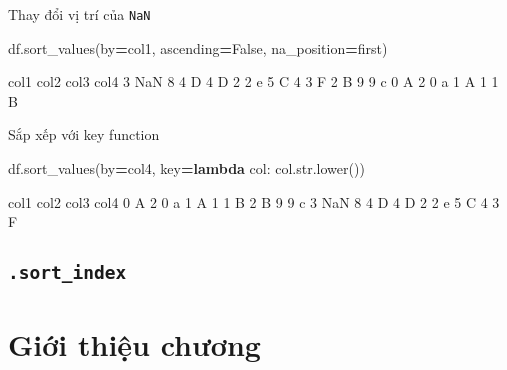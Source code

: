 \documentclass[
]{book}
\newenvironment{Shaded}{\begin{snugshade}}{\end{snugshade}}
\newcommand{\BuiltInTok}[1]{#1}
\newcommand{\KeywordTok}[1]{\textcolor[rgb]{0.13,0.29,0.53}{\textbf{#1}}}
\newcommand{\NormalTok}[1]{#1}
\newcommand{\OperatorTok}[1]{\textcolor[rgb]{0.81,0.36,0.00}{\textbf{#1}}}
\newcommand{\StringTok}[1]{\textcolor[rgb]{0.31,0.60,0.02}{#1}}
\newcommand{\VariableTok}[1]{\textcolor[rgb]{0.00,0.00,0.00}{#1}}
\begin{document}
Thay đổi vị trí của \texttt{NaN}

\begin{Shaded}
\begin{Highlighting}[]
\NormalTok{df.sort\_values(by}\OperatorTok{=}\StringTok{\textquotesingle{}col1\textquotesingle{}}\NormalTok{, ascending}\OperatorTok{=}\VariableTok{False}\NormalTok{, na\_position}\OperatorTok{=}\StringTok{\textquotesingle{}first\textquotesingle{}}\NormalTok{)}
\end{Highlighting}
\end{Shaded}

\begin{Shaded}
\begin{Highlighting}[]
\NormalTok{  col1  col2  col3 col4}
\NormalTok{3  NaN     8     4    D}
\NormalTok{4    D     2     2    e}
\NormalTok{5    C     4     3    F}
\NormalTok{2    B     9     9    c}
\NormalTok{0    A     2     0    a}
\NormalTok{1    A     1     1    B}
\end{Highlighting}
\end{Shaded}

Sắp xếp với key function

\begin{Shaded}
\begin{Highlighting}[]
\NormalTok{df.sort\_values(by}\OperatorTok{=}\StringTok{\textquotesingle{}col4\textquotesingle{}}\NormalTok{, key}\OperatorTok{=}\KeywordTok{lambda}\NormalTok{ col: col.}\BuiltInTok{str}\NormalTok{.lower())}
\end{Highlighting}
\end{Shaded}

\begin{Shaded}
\begin{Highlighting}[]
\NormalTok{  col1  col2  col3 col4}
\NormalTok{0    A     2     0    a}
\NormalTok{1    A     1     1    B}
\NormalTok{2    B     9     9    c}
\NormalTok{3  NaN     8     4    D}
\NormalTok{4    D     2     2    e}
\NormalTok{5    C     4     3    F}
\end{Highlighting}
\end{Shaded}

\section{\texorpdfstring{\texttt{.sort\_index}}{.sort\_index}}\label{sort_index}

\chapter{Giới thiệu chương}\label{giux1edbi-thiux1ec7u-chux1b0ux1a1ng}
\end{document}
